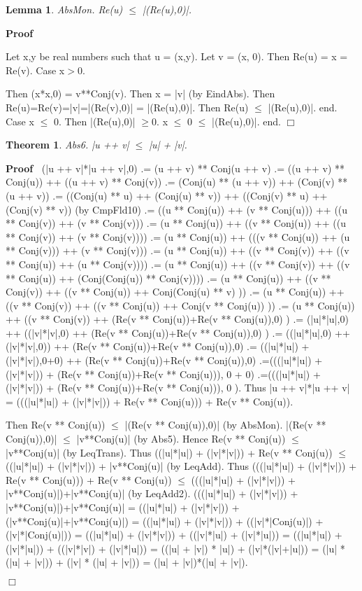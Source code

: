 \documentclass{article}
\newenvironment{forthel}{\begin{leftbar}}{\end{leftbar}}
\newenvironment{proof}{\noindent\textbf{Proof\ }}{\hspace*{\fill}$\Box$\medskip}
\newtheorem{lemma}{Lemma}
\newtheorem{theorem}{Theorem}
\begin{document}
\begin{forthel}
\begin{lemma} AbsMon. Re(u) $\leq$ |(Re(u),0)|.

\end{lemma}
\begin{proof}

Let x,y be real numbers such that u = (x,y).
Let v = (x, 0).
Then Re(u) = x = Re(v).
Case x$>$0.

Then (x*x,0) = v**Conj(v).
Then x = |v| (by EindAbs).
Then Re(u)=Re(v)=|v|=|(Re(v),0)| = |(Re(u),0)|.
Then Re(u) $\leq$ |(Re(u),0)|.
end.
Case x $\leq$ 0.
Then |(Re(u),0)| $\geq$0.
x $\leq$ 0 $\leq$ |(Re(u),0)|.
end.
\end{proof}


\begin{theorem}
 Abs6. |u ++ v| $\leq$ |u| + |v|.
\end{theorem}\begin{proof}
 (|u ++ v|*|u ++ v|,0)	.= (u ++ v) ** Conj(u ++ v)
.=  ((u ++ v) ** Conj(u)) ++ ((u ++ v) ** Conj(v)) 
.=  (Conj(u) ** (u ++ v)) ++ (Conj(v) ** (u ++ v)) 
.=  ((Conj(u) ** u) ++ (Conj(u) ** v)) ++ ((Conj(v) ** u) ++ (Conj(v) ** v)) (by CmpFld10)
.=  ((u ** Conj(u)) ++ (v ** Conj(u))) ++ ((u ** Conj(v)) ++ (v ** Conj(v)))
.=  (u ** Conj(u)) ++ ((v ** Conj(u)) ++ ((u ** Conj(v)) ++ (v ** Conj(v))))
.=  (u ** Conj(u)) ++ (((v ** Conj(u)) ++ (u ** Conj(v))) ++ (v ** Conj(v)))
.=  (u ** Conj(u)) ++ ((v ** Conj(v)) ++ ((v ** Conj(u)) ++ (u ** Conj(v)))) 
.=  (u ** Conj(u)) ++ ((v ** Conj(v)) ++ ((v ** Conj(u)) ++ (Conj(Conj(u)) ** Conj(v))))
.=  (u ** Conj(u)) ++ ((v ** Conj(v)) ++ ((v ** Conj(u)) ++ Conj(Conj(u) ** v) ))
.=  (u ** Conj(u)) ++ ((v ** Conj(v)) ++ ((v ** Conj(u)) ++ Conj(v ** Conj(u)) ))
.=  (u ** Conj(u)) ++ ((v ** Conj(v)) ++ (Re(v ** Conj(u))+Re(v ** Conj(u)),0) )
.=  (|u|*|u|,0) ++ ((|v|*|v|,0) ++ (Re(v ** Conj(u))+Re(v ** Conj(u)),0) )
.=  ((|u|*|u|,0) ++ (|v|*|v|,0)) ++ (Re(v ** Conj(u))+Re(v ** Conj(u)),0)
.= ((|u|*|u|) + (|v|*|v|),0+0) ++ (Re(v ** Conj(u))+Re(v ** Conj(u)),0)
.=(((|u|*|u|) + (|v|*|v|)) + (Re(v ** Conj(u))+Re(v ** Conj(u))), 0 + 0)
.=(((|u|*|u|) + (|v|*|v|)) + (Re(v ** Conj(u))+Re(v ** Conj(u))), 0 ).
Thus |u ++ v|*|u ++ v| = (((|u|*|u|) + (|v|*|v|)) + Re(v ** Conj(u))) + Re(v ** Conj(u)).


Then Re(v ** Conj(u)) $\leq$ |(Re(v ** Conj(u)),0)| (by AbsMon). |(Re(v ** Conj(u)),0)| $\leq$ |v**Conj(u)| (by Abs5).
Hence Re(v ** Conj(u)) $\leq$ |v**Conj(u)| (by LeqTrans).
Thus ((|u|*|u|) + (|v|*|v|)) + Re(v ** Conj(u)) $\leq$ ((|u|*|u|) + (|v|*|v|)) + |v**Conj(u)| (by LeqAdd).
Thus (((|u|*|u|) + (|v|*|v|)) + Re(v ** Conj(u))) + Re(v ** Conj(u)) $\leq$ (((|u|*|u|) + (|v|*|v|)) + |v**Conj(u)|)+|v**Conj(u)| (by LeqAdd2).
(((|u|*|u|) + (|v|*|v|)) + |v**Conj(u)|)+|v**Conj(u)|
= ((|u|*|u|) + (|v|*|v|)) + (|v**Conj(u)|+|v**Conj(u)|) 
= ((|u|*|u|) + (|v|*|v|)) + ((|v|*|Conj(u)|) + (|v|*|Conj(u)|))
= ((|u|*|u|) + (|v|*|v|)) + ((|v|*|u|) + (|v|*|u|))
= ((|u|*|u|) + (|v|*|u|)) + ((|v|*|v|) + (|v|*|u|))
= ((|u| + |v|) * |u|) + (|v|*(|v|+|u|))
= (|u| * (|u| + |v|)) + (|v| * (|u| + |v|))
= (|u| + |v|)*(|u| + |v|).


\end{proof}
\end{forthel}
\end{document}
